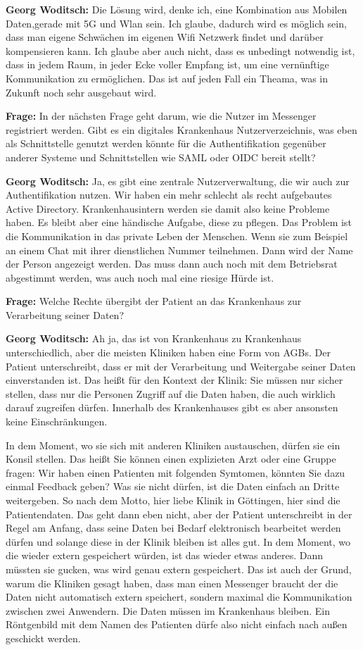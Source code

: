 \textbf{Georg Woditsch: } Die Lösung wird, denke ich, eine Kombination aus Mobilen Daten,gerade mit 5G und Wlan sein. Ich glaube, dadurch wird es möglich sein, dass man eigene Schwächen im eigenen Wifi Netzwerk findet und darüber kompensieren kann. Ich glaube aber auch nicht, dass es unbedingt notwendig ist, dass in jedem Raum, in jeder Ecke voller Empfang ist, um eine vernünftige Kommunikation zu ermöglichen. Das ist auf jeden Fall ein Theama, was in Zukunft noch sehr ausgebaut wird.

\textbf{Frage: } In der nächsten Frage geht darum, wie die Nutzer im Messenger registriert werden. Gibt es ein digitales Krankenhaus Nutzerverzeichnis, was eben als Schnittstelle genutzt werden könnte für die Authentifikation gegenüber anderer Systeme und Schnittstellen wie SAML oder OIDC bereit stellt?

\textbf{Georg Woditsch: } Ja, es gibt eine zentrale Nutzerverwaltung, die wir auch zur Authentifikation nutzen. Wir haben ein mehr schlecht als recht aufgebautes Active Directory. Krankenhausintern werden sie damit also keine Probleme haben. Es bleibt aber eine händische Aufgabe, diese zu pflegen. Das Problem ist die Kommunikation in das private Leben der Menschen. Wenn sie zum Beispiel an einem Chat mit ihrer dienstlichen Nummer teilnehmen. Dann wird der Name der Person angezeigt werden. Das muss dann auch noch mit dem Betriebsrat abgestimmt werden, was auch noch mal eine riesige Hürde ist.

\textbf{Frage: } Welche Rechte übergibt der Patient an das Krankenhaus zur Verarbeitung seiner Daten?

\textbf{Georg Woditsch: } Ah ja, das ist von Krankenhaus zu Krankenhaus unterschiedlich, aber die meisten Kliniken haben eine Form von AGBs. Der Patient unterschreibt, dass er mit der Verarbeitung und Weitergabe seiner Daten einverstanden ist. Das heißt für den Kontext der Klinik: Sie müssen nur sicher stellen, dass nur die Personen Zugriff auf die Daten haben, die auch wirklich darauf zugreifen dürfen. Innerhalb des Krankenhauses gibt es aber ansonsten keine Einschränkungen.

In dem Moment, wo sie sich mit anderen Kliniken austauschen, dürfen sie ein Konsil stellen. Das heißt Sie können einen explizieten Arzt oder eine Gruppe fragen: Wir haben einen Patienten mit folgenden Symtomen, könnten Sie dazu einmal Feedback geben? Was sie nicht dürfen, ist die Daten einfach an Dritte weitergeben. So nach dem Motto, hier liebe Klinik in Göttingen, hier sind die Patientendaten.  Das geht dann eben nicht, aber der Patient unterschreibt in der Regel am Anfang, dass seine Daten bei Bedarf elektronisch bearbeitet werden dürfen und solange diese in der Klinik bleiben ist alles gut. In dem Moment, wo die wieder extern gespeichert würden, ist das wieder etwas anderes. Dann müssten sie gucken, was wird genau extern gespeichert. Das ist auch  der Grund, warum die Kliniken gesagt haben, dass man einen Messenger braucht der die Daten nicht automatisch extern speichert, sondern maximal die Kommunikation zwischen zwei Anwendern. Die Daten müssen im Krankenhaus bleiben. Ein Röntgenbild mit dem Namen des Patienten dürfe also nicht einfach nach außen geschickt werden.


